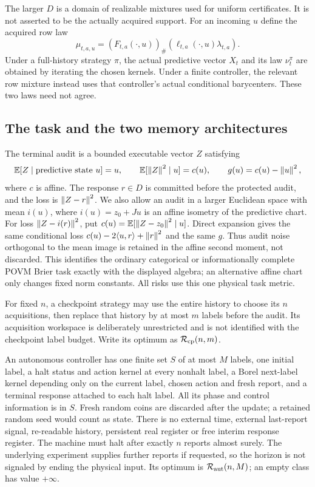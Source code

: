 The larger $D$ is a domain of realizable mixtures used for uniform certificates. It is not asserted to be the actually acquired support. For an incoming $u$ define the acquired row law
\begin{equation}\label{eq:row}
 \mu_{t,a,u}=(F_{t,a}(\cdot,u))_\#
       (\ell_{t,a}(\cdot,u)\lambda_{t,a}).
\end{equation}
Under a full-history strategy $\pi$, the actual predictive vector $X_t$ and its law $\nu_t^\pi$ are obtained by iterating the chosen kernels. Under a finite controller, the relevant row mixture instead uses that controller's actual conditional barycenters. These two laws need not agree.

\subsection{The task and the two memory architectures}
The terminal audit is a bounded executable vector $Z$ satisfying
\begin{equation}\label{eq:task}
 \mathbb E[Z\mid\text{predictive state }u]=u,\qquad
 \mathbb E[\left\lVert Z\right\rVert^2\mid u]=c(u),\qquad
 g(u)=c(u)-\left\lVert u\right\rVert^2,
\end{equation}
where $c$ is affine. The response $r\in D$ is committed before the protected audit, and the loss is $\left\lVert Z-r\right\rVert^2$. We also allow an audit in a larger Euclidean space with mean $i(u)$, where $i(u)=z_0+Ju$ is an affine isometry of the predictive chart. For loss $\left\lVert Z-i(r)\right\rVert^2$, put $c(u)=\mathbb E[\left\lVert Z-z_0\right\rVert^2\mid u]$. Direct expansion gives the same conditional loss $c(u)-2\langle u,r\rangle+\left\lVert r\right\rVert^2$ and the same $g$. Thus audit noise orthogonal to the mean image is retained in the affine second moment, not discarded. This identifies the ordinary categorical or informationally complete POVM Brier task exactly with the displayed algebra; an alternative affine chart only changes fixed norm constants. All risks use this one physical task metric.

For fixed $n$, a checkpoint strategy may use the entire history to choose its $n$ acquisitions, then replace that history by at most $m$ labels before the audit. Its acquisition workspace is deliberately unrestricted and is not identified with the checkpoint label budget. Write its optimum as $\mathcal R_{\rm cp}(n,m)$.

An autonomous controller has one finite set $S$ of at most $M$ labels, one initial label, a halt status and action kernel at every nonhalt label, a Borel next-label kernel depending only on the current label, chosen action and fresh report, and a terminal response attached to each halt label. All its phase and control information is in $S$. Fresh random coins are discarded after the update; a retained random seed would count as state. There is no external time, external last-report signal, re-readable history, persistent real register or free interim response register. The machine must halt after exactly $n$ reports almost surely. The underlying experiment supplies further reports if requested, so the horizon is not signaled by ending the physical input. Its optimum is $\mathcal R_{\rm aut}(n,M)$; an empty class has value $+\infty$.


